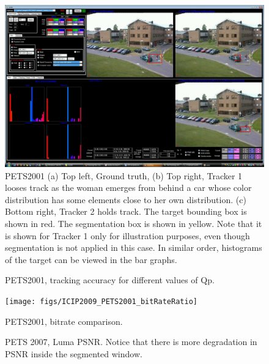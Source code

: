 \documentclass{article}
\begin{document}
\begin{figure}
			\centering
			\includegraphics[width=.45\textwidth]{figs/ICIP2009_PETS2001_FN_00592_snapshotVVG}
			\caption{PETS2001  (a) Top left, Ground truth, (b) Top right, Tracker 1 looses track as the woman emerges from behind a car whose color distribution has some elements close to her own distribution.  (c) Bottom right, Tracker 2 holds track.  The target bounding box is shown in red.  The segmentation box is shown in yellow.  Note that it is shown for Tracker 1 only for illustration purposes, even though segmentation is not applied in this case.  In similar order, histograms of the target can be viewed in the bar graphs.}
\label{fig:PETS2001_Frame_592_small_size}
\end{figure}

\begin{figure}
			\centering

			\caption{PETS2001, tracking accuracy for different values of Qp.} 	
			\label{fig:Accuracy_PETS2001}	
			
\end{figure}

\begin{figure}
			\centering
			\texttt{[image: figs/ICIP2009\_PETS2001\_bitRateRatio]}
			\caption{PETS2001, bitrate comparison.}
			\label{fig:Bitrate_comparison_PETS2001}			
\end{figure}

\begin{figure}
			\centering

			\caption{PETS 2007, Luma PSNR.  Notice that there is more degradation in PSNR inside the segmented window.} 	
			\label{fig:PSNR_Comparison_PETS2001}	
\end{figure}
\end{document}
